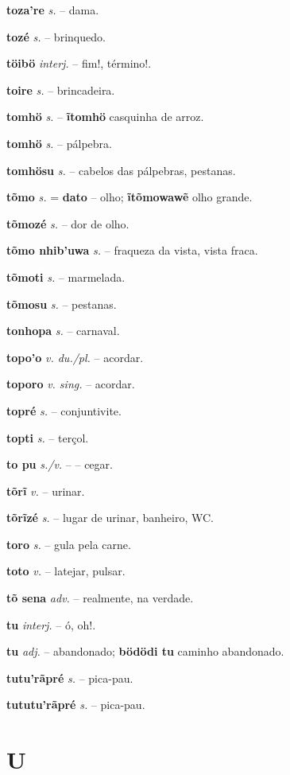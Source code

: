 \textbf{toza're} \textit{s.} -- dama.

\textbf{tozé} \textit{s.} -- brinquedo.

\textbf{töibö} \textit{interj.} -- fim!, término!.

\textbf{toire} \textit{s.} -- brincadeira.

\textbf{tomhö} \textit{s.} -- \textbf{ĩtomhö} casquinha de arroz.

\textbf{tomhö} \textit{s.} -- pálpebra.

\textbf{tomhösu} \textit{s.} -- cabelos das pálpebras, pestanas.

\textbf{tõmo} \textit{s.} = \textbf{dato} -- olho; \textbf{ĩtõmowawẽ} olho grande.

\textbf{tõmozé} \textit{s.} -- dor de olho.

\textbf{tõmo nhib'uwa} \textit{s.} -- fraqueza da vista, vista fraca.

\textbf{tõmoti} \textit{s.} -- marmelada.

\textbf{tõmosu} \textit{s.} -- pestanas.

\textbf{tonhopa} \textit{s.} -- carnaval.

\textbf{topo'o} \textit{v. du./pl.} -- acordar.

\textbf{toporo} \textit{v. sing.} -- acordar.

\textbf{topré} \textit{s.} -- conjuntivite.

\textbf{topti} \textit{s.} -- terçol.

\textbf{to pu} \textit{s./v.} -- -- cegar.

\textbf{tõrĩ} \textit{v.} -- urinar.

\textbf{tõrĩzé} \textit{s.} -- lugar de urinar, banheiro, WC.

\textbf{toro} \textit{s.} -- gula pela carne.

\textbf{toto} \textit{v.} -- latejar, pulsar.

\textbf{tõ sena} \textit{adv.} -- realmente, na verdade.

\textbf{tu} \textit{interj.} -- ó, oh!.

\textbf{tu} \textit{adj.} -- abandonado; \textbf{bödödi tu} caminho abandonado.

\textbf{tutu'rãpré} \textit{s.} -- pica-pau.

\textbf{tututu'rãpré} \textit{s.} -- pica-pau.


\section*{U}



